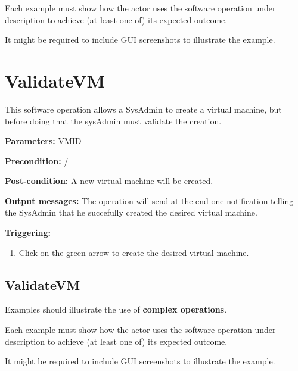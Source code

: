 Each example must show how the actor uses the software operation under
description to achieve (at least one of) its expected outcome.

It might be required to include GUI screenshots to illustrate the example.







\section{ValidateVM}
\label{operation:ValidateVM}
This software operation allows a SysAdmin to create a virtual machine, but
before doing that the sysAdmin must validate the creation.

\begin{description}

\item \textbf{Parameters:} VMID
\item \textbf{Precondition:} /
\item \textbf{Post-condition:} A new virtual machine will be created.
\item \textbf{Output messages:} The operation will send at the end one
notification telling the SysAdmin that he succefully created the desired virtual
machine.

\item \textbf{Triggering:}
\begin{enumerate}
\item Click on the green arrow to create the desired virtual machine.
\end{enumerate}

 
\end{description}

 
\subsection{ValidateVM}
Examples should illustrate the use of \textbf{complex operations}.

Each example must show how the actor uses the software operation under
description to achieve (at least one of) its expected outcome.

It might be required to include GUI screenshots to illustrate the example.








